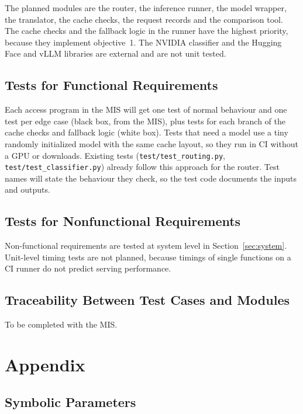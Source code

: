 \documentclass[12pt, titlepage]{article}
\begin{document}
The planned modules are the router, the inference runner, the model
wrapper, the translator, the cache checks, the request records and the
comparison tool. The cache checks and the fallback logic in the runner have
the highest priority, because they implement objective~1. The NVIDIA
classifier and the Hugging Face and vLLM libraries are external and are not
unit tested.

\subsection{Tests for Functional Requirements}

Each access program in the MIS will get one test of normal behaviour and
one test per edge case (black box, from the MIS), plus tests for each
branch of the cache checks and fallback logic (white box). Tests that need a
model use a tiny randomly initialized model with the same cache layout, so
they run in CI without a GPU or downloads. Existing tests
(\texttt{test/test\_routing.py}, \texttt{test/test\_classifier.py}) already
follow this approach for the router. Test names will state the behaviour
they check, so the test code documents the inputs and outputs.

\subsection{Tests for Nonfunctional Requirements}

Non-functional requirements are tested at system level in
Section~\ref{sec:system}. Unit-level timing tests are not planned, because
timings of single functions on a CI runner do not predict serving
performance.

\subsection{Traceability Between Test Cases and Modules}

To be completed with the MIS.




\newpage

\section{Appendix}

\subsection{Symbolic Parameters}
\label{sec:constants}
\end{document}
